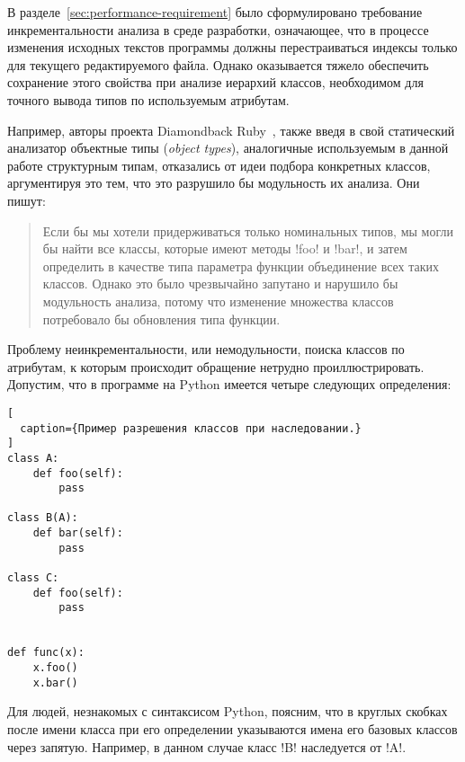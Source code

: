 В разделе~\ref{sec:performance-requirement} было сформулировано требование
инкрементальности анализа в среде разработки, означающее, что в процессе
изменения исходных текстов программы должны перестраиваться индексы только для
текущего редактируемого файла. Однако оказывается тяжело обеспечить сохранение этого
свойства при анализе иерархий классов, необходимом для точного вывода типов по
используемым атрибутам.

Например, авторы проекта Diamondback Ruby~\cite{Furr2009}, также введя в свой
статический анализатор объектные типы (\emph{object types}), аналогичные
используемым в данной работе структурным типам, отказались от идеи
подбора конкретных классов, аргументируя это тем, что это разрушило бы
модульность их анализа. Они пишут:

\begin{quote}
  Если бы мы хотели придерживаться только номинальных типов, мы могли бы найти
  все классы, которые имеют методы !foo! и !bar!, и затем определить в качестве
  типа параметра функции объединение всех таких классов. Однако это было чрезвычайно
  запутано и нарушило бы модульность анализа, потому что изменение множества
  классов потребовало бы обновления типа функции.

\end{quote}

Проблему неинкрементальности, или немодульности, поиска классов по атрибутам, к
которым происходит обращение нетрудно проиллюстрировать. Допустим, что в
программе на Python имеется четыре следующих определения:

\begin{lstlisting}[
  caption={Пример разрешения классов при наследовании.}
]
class A:
    def foo(self):
        pass

class B(A):
    def bar(self):
        pass

class C:
    def foo(self):
        pass


def func(x):
    x.foo()
    x.bar()

\end{lstlisting}

Для людей, незнакомых с синтаксисом Python, поясним, что в круглых скобках после
имени класса при его определении указываются имена его базовых классов
через запятую. Например, в данном случае класс !B! наследуется от !A!.

